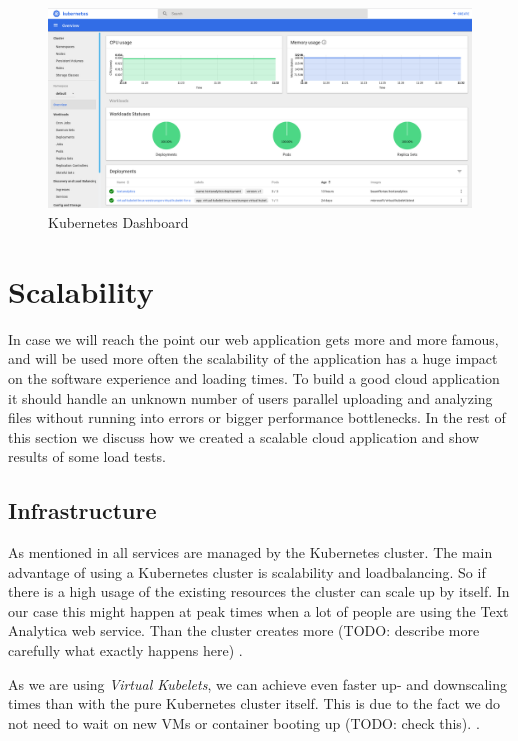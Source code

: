 \documentclass[conference]{IEEEtran}
\begin{document}
\begin{figure}[ht!]
\includegraphics[width=170mm]{img/Kubernetes_Dashboard.png}
\caption{Kubernetes Dashboard}
\label{img:kubernetes-dashboard}
\end{figure}

\section{Scalability}
\label{sec:scalability}
In case we will reach the point our web application gets more and more famous, and will be used more often the scalability of the application has a huge impact on the software experience and loading times. To build a good cloud application it should handle an unknown number of users parallel uploading and analyzing files without running into errors or bigger performance bottlenecks. In the rest of this section we discuss how we created a scalable cloud application and show results of some load tests.

\subsection{Infrastructure}
As mentioned in  all services are managed by the Kubernetes cluster.
The main advantage of using a Kubernetes cluster is scalability and loadbalancing. So if there is a high usage of the
existing resources the cluster can scale up by itself. In our case this might happen at peak times when a lot of people
are using the Text Analytica web service. Than the cluster creates more (TODO:  describe more carefully what exactly happens here)
\cite{MicrosoftAzureKubernetesService}.

As we are using \textit{Virtual Kubelets}, we can achieve even faster up- and downscaling times
than with the pure Kubernetes cluster itself. This is due to the fact we do not need to wait on new VMs or container booting up (TODO: check this).
\cite{MicrosoftVirtualNode}.
\end{document}

